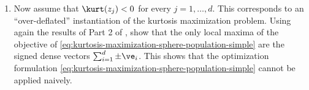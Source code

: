 \documentclass[../../book-main.tex]{subfiles}
\begin{document}
\begin{exercise}
\begin{enumerate}
        (\textit{Hint: count the number of positive and negative eigenvalues of the Riemannian Hessian \eqref{eq:exercise-riemann-hess-sphere} at each critical point.})
        \item Now assume that $\kurt(z_j) < 0$ for every $j =1, \dots, d$. This corresponds to an ``over-deflated'' instantiation of the kurtosis maximization problem. Using again the results of Part 2 of , show that the only local maxima of the objective of \eqref{eq:kurtosis-maximization-sphere-population-simple} are the signed dense vectors $\sum_{i=1}^d \pm \ve_i$.
        This shows that the optimization formulation \eqref{eq:kurtosis-maximization-sphere-population-simple} cannot be applied naively.
    \end{enumerate}
\end{exercise}
\end{document}
